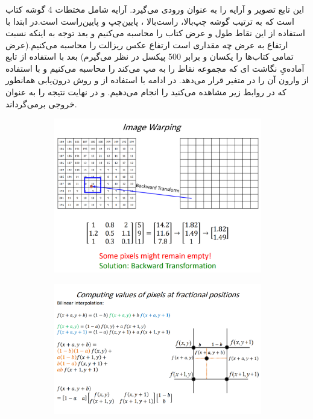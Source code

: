 \documentclass[a4paper,12pt]{article}
\begin{document}
\subsubsection*{}
این تابع تصویر 
و آرایه 
را به عنوان ورودی می‌گیرد. آرایه 
شامل مختطات 4 گوشه کتاب است که به ترتیب گوشه چپ‌بالا، راست‌بالا ، پایین‌چپ و پایین‌راست است.در ابتدا با استفاده از این نقاط طول و عرض کتاب‌ را محاسبه می‌کنیم و بعد توجه به اینکه نسبت ارتفاع به عرض چه مقداری است ارتفاع عکس ریزالت را محاسبه می‌کنیم.(عرض تمامی کتاب‌ها را یکسان و برابر 500 پیکسل در نظر می‌گیرم) بعد با استفاده از تابع آماده‌یِ
نگاشت
ای که مجموعه نقاط 
را به 
مپ می‌کند را محاسبه می‌کنیم و با استفاده از 
وارون آن را در متغیر
قرار می‌دهد. در ادامه با استفاده از 
و روش درون‌یابی 
همانطور که در روابط زیر مشاهده می‌کنید 
را انجام می‌دهیم. و در نهایت نتیجه را به عنوان خروجی برمی‌گرداند.
\begin{figure}[H]
	\centering
	\begin{subfigure}{0.9\textwidth}
		\centering
		\includegraphics[width=\textwidth]{1.png}
	\end{subfigure}
	\begin{subfigure}{0.9\textwidth}
		\centering
		\includegraphics[width=\textwidth]{2.png}
	\end{subfigure}
\end{figure}
\end{document}
